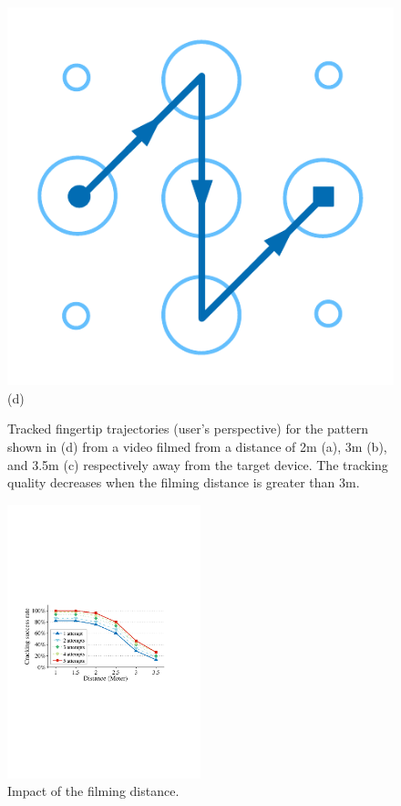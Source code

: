 \begin{figure}[!ht]
{\begin{minipage}[b]{0.19\textwidth}
                \includegraphics[width=\textwidth]{fig/distance-pattern.pdf}\\
                \centering  (d)
                \end{minipage}
            }

            \caption{Tracked fingertip trajectories (user's perspective) for the pattern shown in (d) from a video filmed from a distance of 2m (a), 3m (b), and 3.5m (c) respectively away from the target device. The tracking quality decreases when the filming distance is greater than 3m. }
            \label{fig:distance-show}
        \end{figure}

        \begin{figure}[t!]
            \centering
            \includegraphics[width=0.5\textwidth]{fig/12.pdf}
            \caption{Impact of the filming distance.}
            \label{fig:fig12}
        \end{figure}

